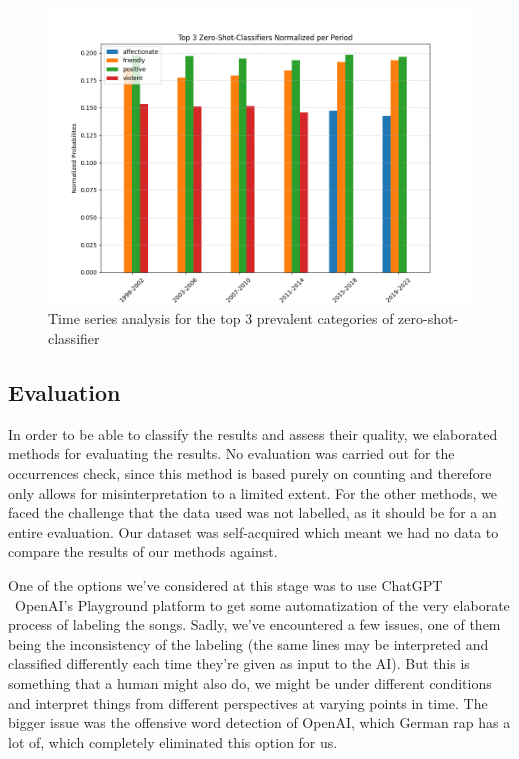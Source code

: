\begin{figure}[!htb]
    \centering
    \includegraphics[width=\textwidth]{figures/top_3_time_series_zero_shot.png}
    \caption{Time series analysis for the top 3 prevalent categories of zero-shot-classifier}
    \label{fig:zero-shot2}
\end{figure}

\subsection*{Evaluation}

In order to be able to classify the results and assess their quality, we elaborated methods for evaluating the results. No evaluation was carried out for the occurrences check, since this method is based purely on counting and therefore only allows for misinterpretation to a limited extent. For the other methods, we faced the challenge that the data used was not labelled, as it should be for a an entire evaluation. Our dataset was self-acquired which meant we had no data to compare the results of our methods against.

One of the options we've considered at this stage was to use ChatGPT \ OpenAI's Playground platform to get some automatization of the very elaborate process of labeling the songs. Sadly, we've encountered a few issues, one of them being the inconsistency of the labeling (the same lines may be interpreted and classified differently each time they're given as input to the AI). But this is something that a human might also do, we might be under different conditions and interpret things from different perspectives at varying points in time. The bigger issue was the offensive word detection of OpenAI, which German rap has a lot of, which completely eliminated this option for us.

